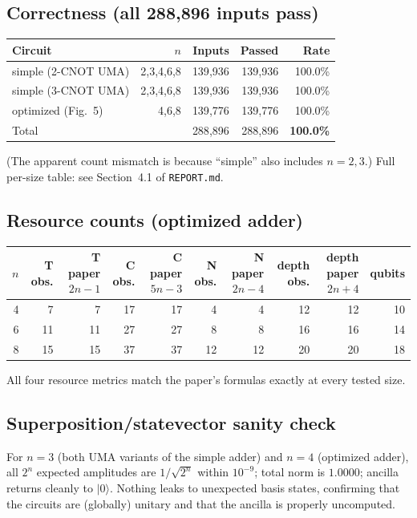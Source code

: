 \documentclass[11pt]{article}
\begin{document}
\subsection{Correctness (all 288{,}896 inputs pass)}
\begin{tabular}{lrrrr}
\toprule
Circuit & $n$ & Inputs & Passed & Rate \\
\midrule
simple (2-CNOT UMA) & 2,3,4,6,8 & 139{,}936 & 139{,}936 & 100.0\% \\
simple (3-CNOT UMA) & 2,3,4,6,8 & 139{,}936 & 139{,}936 & 100.0\% \\
optimized (Fig.~5)  & 4,6,8     &  139{,}776 & 139{,}776 & 100.0\% \\
\midrule
Total               &           & 288{,}896 & 288{,}896 & \textbf{100.0\%} \\
\bottomrule
\end{tabular}

(The apparent count mismatch is because ``simple'' also includes $n=2,3$.)
Full per-size table: see Section~4.1 of \texttt{REPORT.md}.

\subsection{Resource counts (optimized adder)}
\begin{tabular}{rrrrrrrrrr}
\toprule
$n$ & T obs. & T paper $2n{-}1$ & C obs. & C paper $5n{-}3$ & N obs. & N paper $2n{-}4$ & depth obs. & depth paper $2n{+}4$ & qubits \\
\midrule
4 & 7  & 7  & 17 & 17 & 4  & 4  & 12 & 12 & 10 \\
6 & 11 & 11 & 27 & 27 & 8  & 8  & 16 & 16 & 14 \\
8 & 15 & 15 & 37 & 37 & 12 & 12 & 20 & 20 & 18 \\
\bottomrule
\end{tabular}

All four resource metrics match the paper's formulas exactly at every tested size.

\subsection{Superposition/statevector sanity check}
For $n=3$ (both UMA variants of the simple adder) and $n=4$ (optimized adder),
all $2^n$ expected amplitudes are $1/\sqrt{2^n}$ within $10^{-9}$; total norm
is $1.0000$; ancilla returns cleanly to $\lvert 0\rangle$. Nothing leaks to
unexpected basis states, confirming that the circuits are (globally) unitary
and that the ancilla is properly uncomputed.
\end{document}
